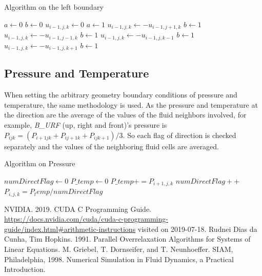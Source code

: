 \documentclass{article}%
\begin{document}
\begin{algorithm}
\caption{Algorithm on the left boundary}\label{euclid}
\begin{algorithmic}
	\State $a\gets 0$
	\State $b\gets 0$ 
    		\State $u_{i-1,j,k}\gets 0$
    		\State $a\gets 1$
    	\EndIf
    			\State $u_{i-1,j,k}\gets -u_{i-1,j+1,k}$
    			\State $b\gets 1$
    		\EndIf	
    	\EndIf
    			\State $u_{i-1,j,k}\gets -u_{i-1,j-1,k}$
    			\State $b\gets 1$
    		\EndIf	
    	\EndIf 
    			\State $u_{i-1,j,k}\gets -u_{i-1,j,k-1}$
    			\State $b\gets 1$
    		\EndIf	
    	\EndIf    	   	
    			\State $u_{i-1,j,k}\gets -u_{i-1,j,k+1}$
    			\State $b\gets 1$
    		\EndIf	
    	\EndIf       	
\EndIf
\EndFor
\end{algorithmic}
\end{algorithm}

\newpage

\subsection{Pressure and Temperature}
When setting the arbitrary geometry boundary conditions of pressure and temperature, the same methodology is used. As the pressure and temperature at the direction are the average of the values of the fluid neighbors involved, for example, \textit{B\_URF} (up, right and front)’s pressure is $P_{ijk} = (P_{i+1jk} + P_{ij+1k} + P_{ijk+1})/3$. So each flag of direction is checked separately and the values of the neighboring fluid cells are averaged.

\begin{algorithm}
\caption{Algorithm on Pressure}\label{euclid}
\begin{algorithmic}
	\State $numDirectFlag\gets 0$
	\State $P\_temp\gets 0$
    		\State $P\_temp += P_{i+1,j,k}$
    		\State $numDirectFlag++$
    	\EndIf
    \State $P_{i,j,k}= P_temp / numDirectFlag$
\EndIf
\EndFor
\end{algorithmic}
\end{algorithm}



\begin{thebibliography}{999}
NVIDIA. 2019. CUDA C Programming Guide. \url{https://docs.nvidia.com/cuda/cuda-c-programming-guide/index.html#arithmetic-instructions} visited on 2019-07-18.
Rudnei Dias da Cunha, Tim Hopkins. 1991. Parallel Overrelaxation Algorithms for Systems of Linear Equations.
M. Griebel, T. Dornseifer, and T. Neunhoeffer. SIAM, Philadelphia, 1998. Numerical Simulation in Fluid Dynamics, a Practical Introduction.
\end{thebibliography}
\end{document}
